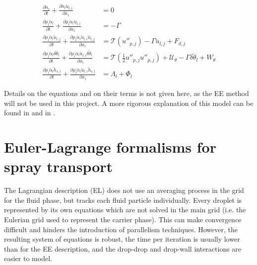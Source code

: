 \begin{subequations}
\label{eq:EE_disperse_phase}
\begin{align}
\frac{\partial \breve{n}_l}{\partial t} + \frac{\partial \breve{n}_l \breve{u}_{l,i}}{\partial x_i} &= 0 \\
\frac{\partial \rho_l \breve{\alpha}_l}{\partial t} + \frac{\partial \rho_l \breve{\alpha}_l \breve{u}_{l,i}}{\partial x_i} &= - \Gamma \\
\frac{\partial \rho_l \breve{\alpha}_l \breve{u}_{l,j}}{\partial t} + \frac{\partial \rho_l \breve{\alpha}_l \breve{u}_{l,i} \breve{u}_{l,j}}{\partial x_i} &= \mathcal{T} \left( u''_{p,j} \right) - \Gamma \breve{u}_{l,j} + F_{d,j} \\
\frac{\partial \rho_l \breve{\alpha}_l \delta \breve{\theta}_l}{\partial t} + \frac{\partial \rho_l \breve{\alpha}_l \breve{u}_{l,i} \delta \breve{\theta}_l }{\partial x_i} &= \mathcal{T} \left( \frac{1}{2} u''_{p,j} u''_{p,j} \right) + \mathcal{U}_\theta - \Gamma \delta \breve{\theta}_l + W_\theta \\
\frac{\partial \rho_l \breve{\alpha}_l \breve{h}_{s,l} }{\partial t} + \frac{\partial \rho_l \breve{\alpha}_l \breve{u}_{l,i} \breve{h}_{s,l} }{\partial x_i} &= \Lambda_l + \Phi_l 
\end{align}
\end{subequations}

Details on the equations and on their terms is not given here, as the EE method will not be used in this project. A more rigorous explanation of this model can be found in  and in .

\section{Euler-Lagrange formalisms for spray transport}
\label{sec:ch3_EL_formalisms}


The Lagrangian description (EL) does not use an averaging process in the grid for the fluid phase, but tracks each fluid particle individually. Every droplet is represented by its own equations which are not solved in the main grid (i.e. the Eulerian grid used to represent the carrier phase). This can make convergence difficult and hinders the introduction of parallelism techniques. However, the resulting system of equations is robust, the time per iteration is usually lower than for the EE description, and the drop-drop and drop-wall interactions are easier to model.

